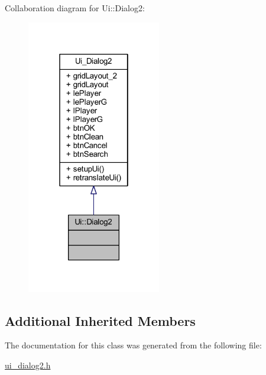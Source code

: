 Collaboration diagram for Ui\+:\+:Dialog2\+:
\nopagebreak
\begin{figure}[H]
\begin{center}
\leavevmode
\includegraphics[width=166pt]{d3/dd2/class_ui_1_1_dialog2__coll__graph}
\end{center}
\end{figure}
\subsection*{Additional Inherited Members}


The documentation for this class was generated from the following file\+:\begin{DoxyCompactItemize}
\item 
\hyperlink{ui__dialog2_8h}{ui\+\_\+dialog2.\+h}\end{DoxyCompactItemize}
